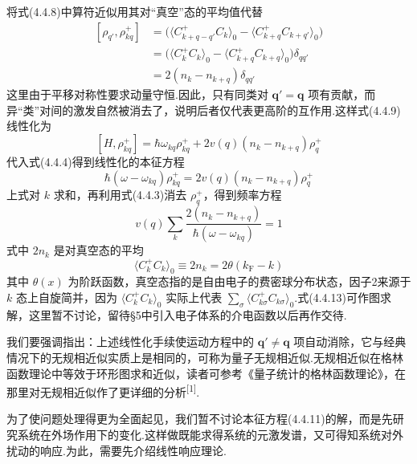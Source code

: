 将式(4.4.8)中算符近似用其对“真空”态的平均值代替
\begin{equation}
\begin{aligned}
  \left[\rho_{q'},\rho_{kq}^{+}\right]
  &=\big(\langle C_{k+q-q'}^{+}C_{k}\rangle_{0}
  -\langle C_{k+q}^{+}C_{k+q'}\rangle_{0}\big)\\
  &=\big(\langle C_{k}^{+}C_{k}\rangle_{0}
  -\langle C_{k+q}^{+}C_{k+q}\rangle_{0}\big)\delta_{qq'}\\
  &=2\left(n_{k}-n_{k+q}\right)\delta_{qq'}
\end{aligned}
\end{equation}
这里由于平移对称性要求动量守恒.因此，只有同类对 $\boldsymbol{q}'=\boldsymbol{q}$ 项有贡献，而异“类”对间的激发自然被消去了，说明后者仅代表更高阶的互作用.这样式(4.4.9)线性化为
\begin{equation}
  \left[H,\rho_{kq}^{+}\right]=\hbar\omega_{kq}\rho_{kq}^{+}
  +2v(q)\left(n_{k}-n_{k+q}\right)\rho_{q}^{+}
\end{equation}
代入式(4.4.4)得到线性化的本征方程
\begin{equation}
  \hbar\left(\omega-\omega_{kq}\right)\rho_{kq}^{+}
  =2v(q)\left(n_{k}-n_{k+q}\right)\rho_{q}^{+}
\end{equation}
上式对 $k$ 求和，再利用式(4.4.3)消去 $\rho_{q}^{+}$，得到频率方程
\begin{equation}
  v(q)\sum_{k}\frac{2\left(n_{k}-n_{k+q}\right)}
  {\hbar\left(\omega-\omega_{kq}\right)}=1
\end{equation}
式中 $2n_{k}$ 是对真空态的平均
\begin{equation}
  \langle C_{k}^{+}C_{k}\rangle_{0}\equiv 2n_{k}=2\theta\left(k_{\mathrm{F}}-k\right)
\end{equation}
其中 $\theta(x)$ 为阶跃函数，真空态指的是自由电子的费密球分布状态，因子2来源于 $k$ 态上自旋简并，因为 $\langle C_{k}^{+}C_{k}\rangle_{0}$ 实际上代表 $\sum\limits_{\sigma}\langle C_{k\sigma}^{+}C_{k\sigma}\rangle_{0}$.式(4.4.13)可作图求解，这里暂不讨论，留待§5中引入电子体系的介电函数以后再作交待.

我们要强调指出：上述线性化手续使运动方程中的 $\boldsymbol{q}'\neq\boldsymbol{q}$ 项自动消除，它与经典情况下的无规相近似实质上是相同的，可称为量子无规相近似.无规相近似在格林函数理论中等效于环形图求和近似，读者可参考《量子统计的格林函数理论》，在那里对无规相近似作了更详细的分析\textsuperscript{[1]}.

为了使问题处理得更为全面起见，我们暂不讨论本征方程(4.4.11)的解，而是先研究系统在外场作用下的变化.这样做既能求得系统的元激发谱，又可得知系统对外扰动的响应.为此，需要先介绍线性响应理论.

